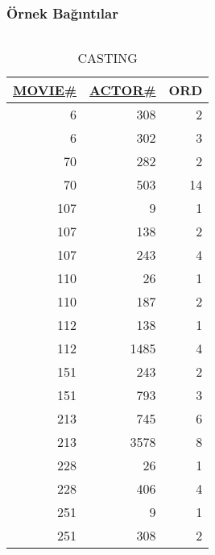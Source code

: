 \documentclass[dvipsnames]{beamer}
\theoremstyle{plain}
\begin{document}
\begin{frame}
  \frametitle{Örnek Bağıntılar}

   \begin{columns}[b]
    \begin{tiny}
    \begin{table}
      \caption{CASTING}
      \begin{tabular}{|r|r|r|}\hline
\underline{MOVIE\#} & \underline{ACTOR\#} & ORD\\[2pt]\hline\hline
      6 &     308 &   2\\\hline
      6 &     302 &   3\\\hline
     70 &     282 &   2\\\hline
     70 &     503 &  14\\\hline
    107 &       9 &   1\\\hline
    107 &     138 &   2\\\hline
    107 &     243 &   4\\\hline
    110 &      26 &   1\\\hline
    110 &     187 &   2\\\hline
    112 &     138 &   1\\\hline
    112 &    1485 &   4\\\hline
    151 &     243 &   2\\\hline
    151 &     793 &   3\\\hline
    213 &     745 &   6\\\hline
    213 &    3578 &   8\\\hline
    228 &      26 &   1\\\hline
    228 &     406 &   4\\\hline
    251 &       9 &   1\\\hline
    251 &     308 &   2\\\hline
      \end{tabular}
    \end{table}
    \end{tiny}


\end{columns}
\end{frame}
\end{document}
